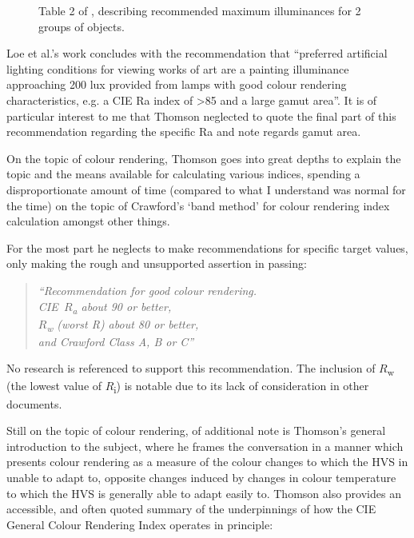 \begin{figure}[htbp]
\caption{Table 2 of \citet[p. 23]{thomson_museum_1986}, describing recommended maximum illuminances for 2 groups of objects.}
\label{fig:Loe}
\end{figure}

Loe et al.'s work concludes with the recommendation that ``preferred artificial lighting conditions for viewing works of art are a painting illuminance approaching 200 lux provided from lamps with good colour rendering characteristics, e.g. a \gls{CIE} Ra index of >85 and a large gamut area''. It is of particular interest to me that Thomson neglected to quote the final part of this recommendation regarding the specific Ra and note regards gamut area.

On the topic of colour rendering, Thomson goes into great depths to explain the topic and the means available for calculating various indices, spending a disproportionate amount of time (compared to what I understand was normal for the time) on the topic of Crawford’s ‘band method’ \citep{crawford_colour_1960,crawford_measurement_1959} for colour rendering index calculation amongst other things.

For the most part he neglects to make recommendations for specific target values, only making the rough and unsupported assertion in passing: 

\begin{quote}
\textit{
``Recommendation for good colour rendering. \\
\gls{CIE}~$R$\textsubscript{a} about 90 or better, \\
$R$\textsubscript{w} (worst R) about 80 or better, \\
and Crawford Class A, B or C''}
\end{quote}

No research is referenced to support this recommendation. The inclusion of $R$\textsubscript{w} (the lowest value of $R$\textsubscript{i}) is notable due to its lack of consideration in other documents. 

Still on the topic of colour rendering, of additional note is Thomson’s general introduction to the subject, where he frames the conversation in a manner which presents colour rendering as a measure of the colour changes to which the HVS in unable to adapt to, opposite changes induced by changes in colour temperature to which the HVS is generally able to adapt easily to. Thomson also provides an accessible, and often quoted summary of the underpinnings of how the CIE General Colour Rendering Index operates in principle:

